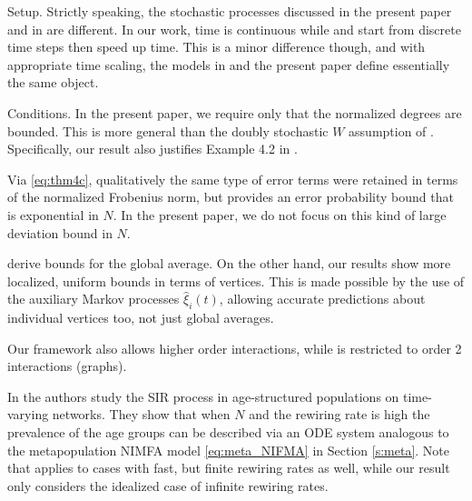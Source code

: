 \documentclass{article}
\newcommand{\1}[1]{{\mathds{1}}_{\left\{#1\right\}}}
\begin{document}
	Setup. Strictly speaking, the stochastic processes discussed in the present paper and in \cite{Sridhar_Kar1, Sridhar_Kar2} are different. In our work, time is continuous while \cite{Sridhar_Kar1} and \cite{Sridhar_Kar2} start from discrete time steps then speed up time. This is a minor difference though, and with appropriate time scaling, the models in \cite{Sridhar_Kar1, Sridhar_Kar2} and the present paper define essentially the same object.
	
	Conditions. In the present paper, we require only that the normalized degrees are bounded. This is more general than the doubly stochastic $W$ assumption of \cite{Sridhar_Kar1, Sridhar_Kar2}. Specifically, our result also justifies Example 4.2 in \cite{ Sridhar_Kar2}.
	
	
	Via \eqref{eq:thm4c}, qualitatively the same type of error terms were retained in terms of the normalized Frobenius norm, but \cite{Sridhar_Kar1, Sridhar_Kar2} provides an error probability bound that is exponential in $N$. In the present paper, we do not focus on this kind of large deviation bound in $N$.
	
	
	\cite{Sridhar_Kar1, Sridhar_Kar2} derive bounds for the global average. On the other hand, our results show more localized, uniform bounds in terms of vertices. This is made possible by the use of the auxiliary Markov processes $\hat{\xi}_{i}(t)$, allowing accurate predictions about individual vertices too, not just global averages. %
	
	Our framework also allows higher order interactions, while \cite{Sridhar_Kar1, Sridhar_Kar2} is restricted to order 2 interactions (graphs).
	
	In \cite{age_structured} the authors study the SIR process in age-structured populations on time-varying networks. They show that when $N$ and the rewiring rate is high the prevalence of the age groups can be described via an ODE system analogous to the metapopulation NIMFA model \eqref{eq:meta_NIFMA} in Section \ref{s:meta}. Note that \cite{age_structured} applies to cases with fast, but finite rewiring rates as well, while our result only considers the idealized case of infinite rewiring rates. 
	
	
	
\end{document}
